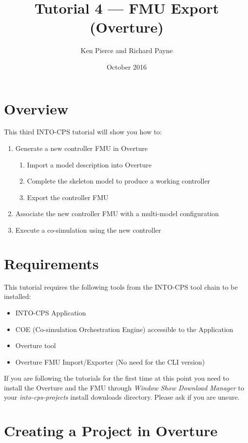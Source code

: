 \documentclass[11pt,a4paper]{../tutorial}
\title{Tutorial 4 --- FMU Export (Overture)}
\date{October 2016}
\author{Ken Pierce and Richard Payne}
\begin{document}
\section*{Overview}

This third INTO-CPS tutorial will show you how to:

\begin{enumerate}[noitemsep]
\item Generate a new controller FMU in Overture
    \begin{enumerate}[noitemsep]
        \item Import a model description into Overture
        \item Complete the skeleton model to produce a working controller
        \item Export the controller FMU
    \end{enumerate}
\item Associate the new controller FMU with a multi-model configuration
\item Execute a co-simulation using the new controller
\end{enumerate}


\section*{Requirements}

This tutorial requires the following tools from the INTO-CPS tool chain to be installed:

\begin{itemize}[noitemsep]
\item INTO-CPS Application
\item COE (Co-simulation Orchestration Engine) accessible to the Application
\item Overture tool 
\item Overture FMU Import/Exporter (No need for the CLI version)
\end{itemize}

If you are following the tutorials for the first time at this point you need to install the Overture and the FMU through \emph{Window \menusep Show Download Manager} to your \emph{into-cps-projects} install downloads directory. Please ask if you are unsure.


\section{Creating a Project in Overture}
\end{document}
